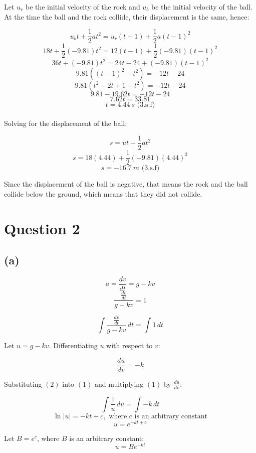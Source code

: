 \documentclass[11pt]{article}
\begin{document}
Let \(u_r\) be the initial velocity of the rock and \(u_b\) be the initial velocity of the ball.
\\[0pt]

At the time the ball and the rock collide, their displacement is the same, hence:

\[u_bt + \frac{1}{2}at^2 = u_r(t - 1) + \frac{1}{2}a(t - 1)^2\]
\[18t + \frac{1}{2}(-9.81)t^2 = 12(t - 1) + \frac{1}{2}(-9.81)(t - 1)^2\]
\[36t + (-9.81)t^2 = 24t - 24 + (-9.81)(t - 1)^2\]
\[9.81((t - 1)^2 - t^2) = -12t - 24\]
\[9.81(t^2 - 2t + 1 - t^2) = -12t - 24\]
\[9.81 - 19.62t = -12t - 24\]
\[7.62t = 33.81\]
\[t = \qty{4.44}{s} \text{ (3.s.f)}\]
\\[0pt]

Solving for the displacement of the ball:

\[s = ut + \frac{1}{2}at^2\]
\[s = 18(4.44) + \frac{1}{2}(-9.81)(4.44)^2\]
\[s = \qty{-16.7}{m} \text{ (3.s.f)}\]

Since the displacement of the ball is negative, that means the rock and the ball collide below the ground, which means that they did not collide.


\section{Question 2}
\label{sec:org5024be6}

\subsection{(a)}
\label{sec:org038da3b}

\[a = \frac{dv}{dt} = g - kv\]
\[\frac{\frac{dv}{dt}}{g - kv} = 1\]

\begin{equation}
\int \frac{\frac{dv}{dt}}{g - kv} \,dt = \int 1 \,dt \tag{1}
\end{equation}

Let \(u = g - kv\). Differentiating \(u\) with respect to \(v\):

\begin{equation}
\frac{du}{dv} = - k \tag{2}
\end{equation}

Substituting \((2)\) into \((1)\) and multiplying \((1)\) by \(\frac{du}{dv}\):

\[\int \frac{1}{u} \, du = \int -k \, dt\]
\[\ln|u| = - kt + c, \text{ where c is an arbitrary constant}\]
\[u = e^{-kt + c}\]

Let \(B = e^c\), where \(B\) is an arbitrary constant:
\[u = Be^{-kt}\]
\end{document}
